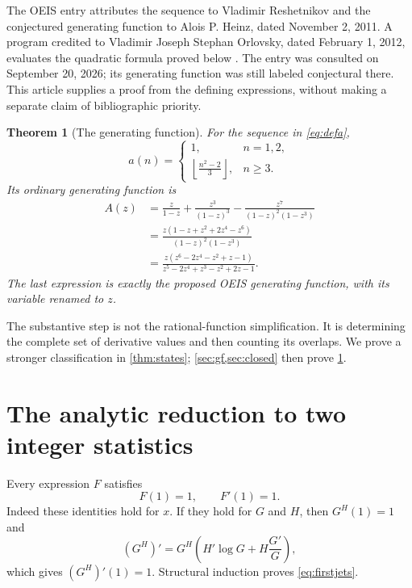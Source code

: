 \documentclass[11pt,letterpaper]{article}
\numberwithin{equation}{section}
\newtheorem{theorem}{Theorem}[section]
\theoremstyle{definition}
\theoremstyle{remark}
\newcommand{\GF}{A(z)}
\begin{document}
The OEIS entry attributes the sequence to Vladimir Reshetnikov and the
conjectured generating function to Alois P. Heinz, dated November 2,
2011. A program credited to Vladimir Joseph Stephan Orlovsky, dated
February 1, 2012, evaluates the quadratic formula proved below
\cite{OEIS199085}. The entry was consulted on September 20, 2026;
its generating function was still labeled conjectural there.
This article supplies a proof from the defining expressions, without
making a separate claim of bibliographic priority.

\begin{theorem}[The generating function]\label{thm:main}
For the sequence in \eqref{eq:defa},
\begin{equation}\label{eq:closed}
 a(n)=
 \begin{cases}
  1,&n=1,2,\\[2pt]
  \displaystyle\left\lfloor\frac{n^2-2}{3}\right\rfloor,&n\ge3.
 \end{cases}
\end{equation}
Its ordinary generating function is
\begin{align}
 \GF
 &=\frac{z}{1-z}+\frac{z^3}{(1-z)^3}
       -\frac{z^7}{(1-z)^2(1-z^3)}\label{eq:gfdecomp}\\[2pt]
 &=\frac{z(1-z+z^2+2z^4-z^6)}{(1-z)^2(1-z^3)}\label{eq:gfpositive}\\[2pt]
 &=\frac{z(z^6-2z^4-z^2+z-1)}
 {z^5-2z^4+z^3-z^2+2z-1}.\label{eq:gfoeis}
\end{align}
The last expression is exactly the proposed OEIS generating function,
with its variable renamed to $z$.
\end{theorem}

The substantive step is not the rational-function simplification.
It is determining the complete set of derivative values and then
counting its overlaps. We prove a stronger classification in
\cref{thm:states}; \cref{sec:gf,sec:closed} then prove
\cref{thm:main}.

\section{The analytic reduction to two integer statistics}
\label{sec:jets}
Every expression $F$ satisfies
\begin{equation}\label{eq:firstjets}
 F(1)=1,\qquad F'(1)=1.
\end{equation}
Indeed these identities hold for $x$. If they hold for $G$ and $H$,
then $G^H(1)=1$ and
\[
 (G^H)'=G^H\left(H'\log G+H\frac{G'}G\right),
\]
which gives $(G^H)'(1)=1$. Structural induction proves
\eqref{eq:firstjets}.
\end{document}
